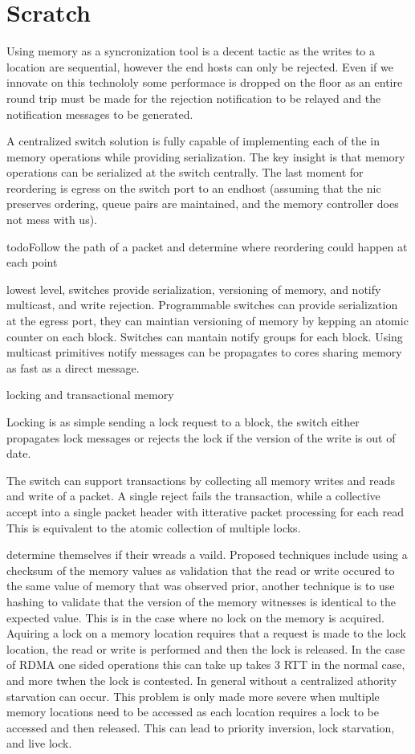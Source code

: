\section{Scratch}
\label{sec:scratch}

Using memory as a syncronization tool is a decent tactic as the writes
to a location are sequential, however the end hosts can only be
rejected. Even if we innovate on this technololy some performace is
dropped on the floor as an entire round trip must be made for the
rejection notification to be relayed and the notification messages to
be generated.

A centralized switch solution is fully capable of implementing each of the in
memory operations while providing serialization. The key insight is that
memory operations can be serialized at the switch centrally. The last moment
for reordering is egress on the switch port to an endhost (assuming that the
nic preserves ordering, queue pairs are maintained, and the memory controller
does not mess with us). 

todo{Follow the path of a packet and determine where reordering could
happen at each point}

lowest level, switches provide serialization, versioning of memory, and notify multicast, and write rejection.
Programmable switches can provide serialization at the egress port, they can
maintian versioning of memory by kepping an atomic counter on each block.
Switches can mantain notify groups for each block. Using multicast primitives
notify messages can be propagates to cores sharing memory as fast as a direct
message. 

locking and transactional memory

Locking is as simple sending a lock request to a block, the switch either
propagates lock messages or rejects the lock if the version of the write is
out of date.

The switch can support transactions by collecting all memory writes and reads
and write of a packet. A single reject fails the transaction, while a
collective accept into a single packet header with itterative packet
processing for each read This is equivalent to the atomic collection of
multiple locks.

determine themselves if their wreads a vaild. Proposed techniques include
using a checksum of the memory values as validation that the read or write
occured to the same value of memory that was observed prior, another
technique is to use hashing to validate that the version of the memory
witnesses is identical to the expected value. This is in the case where no
lock on the memory is acquired. Aquiring a lock on a memory location requires
that a request is made to the lock location, the read or write is performed
and then the lock is released. In the case of RDMA one sided operations this
can take up takes 3 RTT in the normal case, and more twhen the lock is
contested. In general without a centralized athority starvation can occur.
This problem is only made more severe when multiple memory locations need to
be accessed as each location requires a lock to be accessed and then
released. This can lead to priority inversion, lock starvation, and live
lock. 

